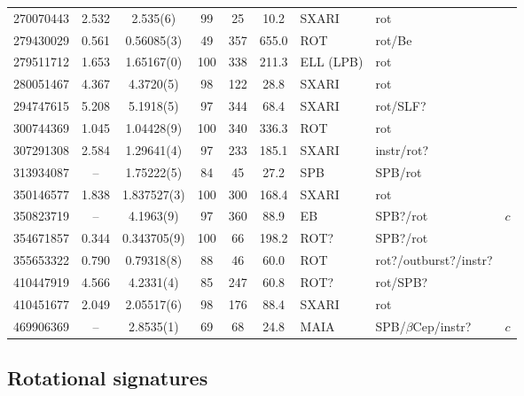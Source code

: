 \documentclass[RNAAS]{aastex63}
\begin{document}
\begin{table}[h]
\begin{tabular}{rcccccllc}
270070443	&	2.532	&	2.535(6)&		99	&	25	&	10.2	&SXARI&	rot	&	\\
279430029	&	0.561	&	0.56085(3)&		49	&	357	&	655.0	&ROT&	rot/Be	&	\\
279511712	&	1.653	&	1.65167(0)&		100	&	338	&	211.3&ELL (LPB)&	rot	&	\\
280051467	&	4.367	&	4.3720(5)&		98	&	122	&	28.8	&SXARI&	rot	&	\\
294747615	&	5.208	&	5.1918(5)&		97	&	344	&	68.4	&SXARI&	rot/SLF?	&	\\
300744369	&	1.045	&	1.04428(9)&	100	&	340	&	336.3	&ROT&	rot	&	\\
307291308	&	2.584	&	1.29641(4)&		97	&	233	&	185.1	&SXARI&	instr/rot?	&	\\
313934087	&	--	&	1.75222(5)&		84	&	45	&	27.2	&SPB&	SPB/rot	&	\\
350146577	&	1.838	&	1.837527(3)&		100	&	300	&	168.4	&SXARI&	rot	&	\\
350823719	&	--	&	4.1963(9)&		97	&	360	&	88.9	&EB&	SPB?/rot	& $c$\\
354671857	&	0.344	&	0.343705(9)&		100	&	66	&	198.2	&ROT?&	SPB?/rot	&	\\
355653322	&	0.790	&	0.79318(8)&		88	&	46	&	60.0	&ROT&	rot?/outburst?/instr?	&	\\
410447919	&	4.566	&	4.2331(4)&		85	&	247	&	60.8	&ROT?&	rot/SPB?	&	\\
410451677	&	2.049	&	2.05517(6)&	98	&	176	&	88.4	&SXARI&	rot	&	\\
469906369	&	--	&	2.8535(1)&		69	&	68	&	24.8	&MAIA&	SPB/$\beta$Cep/instr?	&	$c$\\\hline 
\hline
    \end{tabular}
\end{table}

\subsection{Rotational signatures} \label{subsec:rotation}
\end{document}
